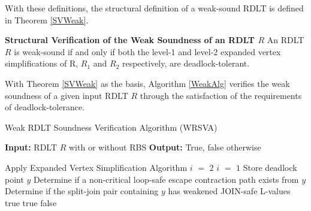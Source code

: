 With these definitions, the structural definition of a weak-sound RDLT is defined in Theorem \ref{SVWeak}.

\begin{thm}\textbf{Structural Verification of the Weak Soundness of an RDLT $ R $}
    \label{SVWeak}
    An RDLT $ R $ is weak-sound if and only if both the level-1 and level-2 expanded vertex simplifications of R, $ R_1 $ and $ R_2 $ respectively, are deadlock-tolerant.
\end{thm}

With Theorem \ref{SVWeak} as the basis, Algorithm \ref{WeakAlg} verifies the weak soundness of a given input RDLT $ R $ through the satisfaction of the requirements of deadlock-tolerance.

\begin{algorithm}[H]
    \caption{Weak RDLT Soundness Verification Algorithm (WRSVA) }
    \label{WeakAlg}
    \begin{algorithmic}
        \State \textbf{Input:} RDLT $ R $ with or without RBS
        \State \textbf{Output:} True, false otherwise
    \end{algorithmic}
    \begin{algorithmic}[1]
        \State Apply Expanded Vertex Simplification Algorithm \cite{MalinaoWCTP2023}
            \State $ i $ $ = $ $ 2 $
        \Else
            \State $ i $ $ = $ $ 1 $
        \EndIf
                \State Store deadlock point $ y $
            \EndFor
                \State Determine if a non-critical loop-safe escape contraction path exists from $ y $
                \State Determine if the split-join pair containing $ y $ has weakened JOIN-safe L-values
            \EndFor            
        \EndFor
                    \State \Return true
                \EndIf
            \EndIf
            \State \Return true
        \Else
            \State \Return false
        \EndIf
    \end{algorithmic}
\end{algorithm}

